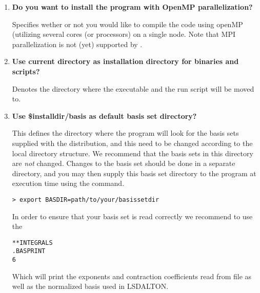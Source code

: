 \begin{enumerate}

\item {\bf Do you want to install the program with OpenMP parallelization?}

Specifies wether or not you would like to compile the code using openMP (utilizing
several cores (or processors) on a single node.
Note that MPI parallelization
is not (yet) supported by {\lsdalton}.

%
%
%

\item {\bf Use current directory as installation directory for binaries and scripts?}

Denotes the directory where the executable and the
run script will be moved to.

\item {\bf Use \$installdir/basis as default basis set directory?}

This defines the directory where the program will look for the
basis sets supplied with the distribution, and this need to be
changed according to the local directory structure. We recommend
that the basis sets in this directory are {\em not} changed.
Changes to the basis set should be done in a separate
directory, and you may then supply this basis set directory to the program
at execution time using the command.
\begin{verbatim}
> export BASDIR=path/to/your/basissetdir
\end{verbatim}
In order to ensure that your basis set is read correctly we recommend to use the
\begin{verbatim}
**INTEGRALS
.BASPRINT 
6
\end{verbatim}
Which will print the exponents and contraction coefficients read from file as 
well as the normalized basis used in LSDALTON.  


\end{enumerate}
